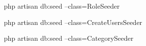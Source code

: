  php artisan db:seed --class=RoleSeeder

php artisan db:seed --class=CreateUsersSeeder

php artisan db:seed --class=CategorySeeder
